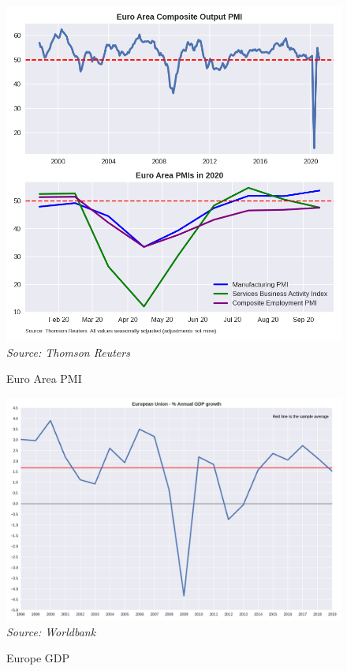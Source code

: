 \documentclass[12pt,a4paper]{article}
\begin{document}
 \begin{figure}[h!]
\caption{Euro Area PMI}
\centering
\label{figure1}
\includegraphics[width=13cm]{plots.png}
{\it Source: Thomson Reuters}
\end{figure}

\newpage 

 \begin{figure}[h!]
\caption{Europe GDP}
\centering
\label{figure1}
\includegraphics[width=13cm]{EU_GDP.png}
{\it Source: Worldbank}
\end{figure}

\newpage 
\end{document}
